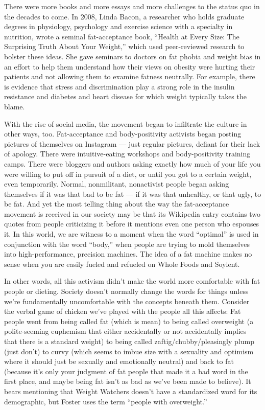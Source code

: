 There were more books and more essays and more challenges to the status
quo in the decades to come. In 2008, Linda Bacon, a researcher who holds
graduate degrees in physiology, psychology and exercise science with a
specialty in nutrition, wrote a seminal fat-acceptance book, ``Health at
Every Size: The Surprising Truth About Your Weight,'' which used
peer-reviewed research to bolster these ideas. She gave seminars to
doctors on fat phobia and weight bias in an effort to help them
understand how their views on obesi­ty were hurting their patients and
not allowing them to examine fatness neutrally. For example, there is
evidence that stress and discrimination play a strong role in the
insulin resistance and diabetes and heart disease for which weight
typi­cally takes the blame.

With the rise of social media, the movement began to infiltrate the
culture in other ways, too. Fat-acceptance and body-positivity activists
began posting pictures of themselves on Instagram --- just regular
pictures, defiant for their lack of apology. There were intuitive-eating
workshops and body-positivity training camps. There were bloggers and
authors asking exactly how much of your life you were willing to put off
in pursuit of a diet, or until you got to a certain weight, even
temporarily. Normal, nonmilitant, nonactivist people began asking
themselves if it was that bad to be fat --- if it was that unhealthy, or
that ugly, to be fat. And yet the most telling thing about the way the
fat-acceptance movement is received in our society may be that its
Wikipedia entry contains two quotes from people criticizing it before it
mentions even one person who espouses it. In this world, we are witness
to a moment when the word ``optimal'' is used in conjunction with the
word ``body,'' when people are trying to mold themselves into
high-performance, precision machines. The idea of a fat machine makes no
sense when you are easily fueled and refueled on Whole Foods and
Soylent.

In other words, all this activism didn't make the world more comfortable
with fat people or dieting. Society doesn't normally change the words
for things unless we're fundamentally uncomfortable with the concepts
beneath them. Consider the verbal game of chicken we've played with the
people all this affects: Fat people went from being called fat (which is
mean) to being called overweight (a polite-seeming euphemism that either
accidentally or not accidentally implies that there is a standard
weight) to being called zaftig/chubby/pleasingly plump (just don't) to
curvy (which seems to imbue size with a sexuality and optimism where it
should just be sexually and emotionally neutral) and back to fat
(because it's only your judgment of fat people that made it a bad word
in the first place, and maybe being fat isn't as bad as we've been made
to believe). It bears mentioning that Weight Watchers doesn't have a
standardized word for its demographic, but Foster uses the term ``people
with overweight.''

